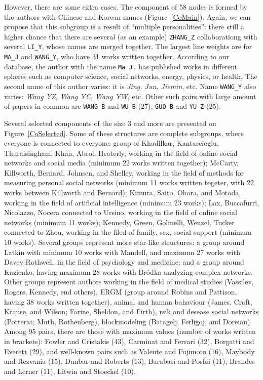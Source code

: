 \documentclass[11pt]{article} %
\begin{document}
However, there are some extra cases. The component of 58 nodes is formed by the authors with Chinese and Korean names (Figure~\ref{CoMain}). Again, we can propose that this subgroup is a result of ``multiple personalities'': there still a higher chance that there are several (as an example) \texttt{ZHANG\_Z} collaborationg with several \texttt{LI\_Y}, whose names are merged together. The largest line weights are for \texttt{MA\_J} and \texttt{WANG\_Y}, who have 31 works written together. According to our database, the author with the name \texttt{Ma J.} has published works in different spheres such as computer science, social networks, energy, physics, or health. The second name of this author varies: it is \textit{Jing, Jun, Jiemin}, etc. Name \texttt{WANG\_Y} also varies: \textit{Wang YZ, Wang YC, Wang YW}, etc. Other such pairs with large amount of papers in common are \texttt{WANG\_B} and \texttt{WU\_B} (27), \texttt{GUO\_B} and \texttt{YU\_Z} (25). \medskip 

Several selected components of the size 3 and more are presented on Figure~\ref{CoSelected}. Some of these structures are complete subgroups, where everyone is connected to everyone: group of Khadilkar, Kantarcioglu, Thuraisingham, Khan, Abrol, Heaterly, working in the field of online social networks and social media (minimum 22 works written together); McCarty, Killworth, Bernard, Johnsen, and Shelley, working in the field of methods for measuring personal social networks (minimum 11 works written togeter, with 22 works between Killworth and Bernard); Kimura, Saito, Ohara, and Motoda, working in the field of artificial intelligence (minimum 23 works); Lax, Buccafurri, Nicolazzo, Nocera connected to Ursino, working in the field of online social networks (minimum 11 works); Kennedy, Green, Golinelli, Wenzel, Tucker connected to Zhou, working in the filed of family, sex, social support (minimum 10 works). Several groups represent more star-like structures: a group around Latkin with minimum 10 works with Mandell, and maximum 27 works with Davey-Rothwell, in the field of psychology and medicine; and a group around Kazienko, having maximum 28 works with Bródka analyzing complex networks. Other groups represent authors working in the field of medical studies (Vassilev, Rogers, Kennedy, end others), ERGM (group around Robins and Pattison, having 38 works written together), animal and human bahaviour (James, Croft, Krause, and Wilson; Farine, Sheldon, and Firth), rsik and desease social networks (Potterat; Muth, Rothenberg), blockmodeling (Batagelj, Ferligoj, and Doreian). Among 95 pairs, there are those with maximum values (number of works written in brackets): Fowler and Cristakis (43), Carminat and Ferrari (32), Borgatti and Everett (29), and well-known pairs such as Valente and Fujimoto (16), Maybody and Rezvania (15), Dunbar and Roberts (13), Barabasi and Posfai (11), Brandes and Lerner (11), Litwin and Stoeckel (10). \medskip 
\end{document}
